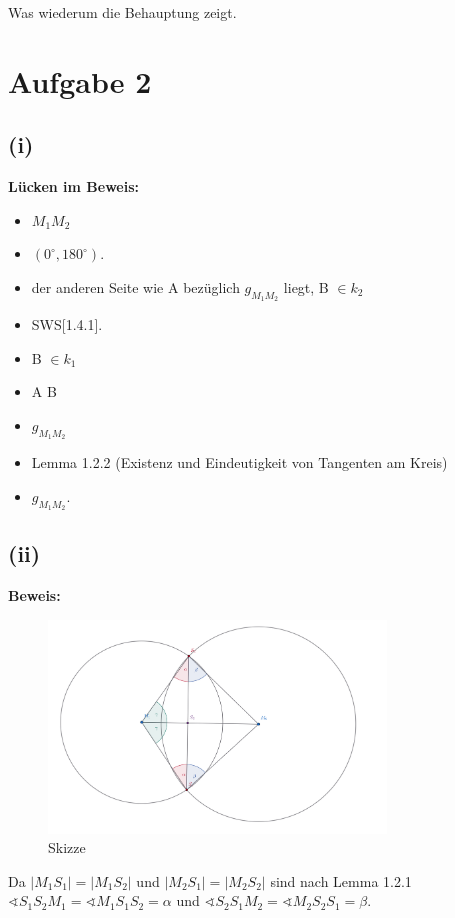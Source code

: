 \documentclass[12pt,a4paper]{article}
\begin{document}
\noindent Was wiederum die Behauptung zeigt.

\newpage
\section*{Aufgabe 2}
\subsection*{(i)} 
\textbf{Lücken im Beweis:}
\begin{itemize}
    \item $M_1M_2$
    \item \((0^\circ, 180^\circ)\).
    \item der anderen Seite wie A bezüglich $g_{M_1M_2}$ liegt, B $\in k_2$
    \item SWS[1.4.1].
    \item B $\in k_1$
    \item A \ne B
    \item \(g_{M_1M_2}\)
    \item Lemma 1.2.2 (Existenz und Eindeutigkeit von Tangenten am Kreis)
    \item \(g_{M_1M_2}\).
\end{itemize} 

\newpage
\subsection*{(ii)} 
\textbf{Beweis:}
\begin{figure}[htbp]   
    \centering   
    \includegraphics[width=0.8\textwidth]{Blatt_01_Aufgabe_2_ii.png}   
    \caption{Skizze}   
    \label{fig:mein_bild} 
\end{figure}

\noindent Da $|M_1S_1| = |M_1S_2|$ und $|M_2S_1| = |M_2S_2|$ sind nach Lemma 1.2.1 \\
$\sphericalangle S_1S_2M_1 = \sphericalangle M_1S_1S_2 = \alpha$ und
$\sphericalangle S_2S_1M_2 = \sphericalangle M_2S_2S_1 = \beta$.\\
\end{document}
